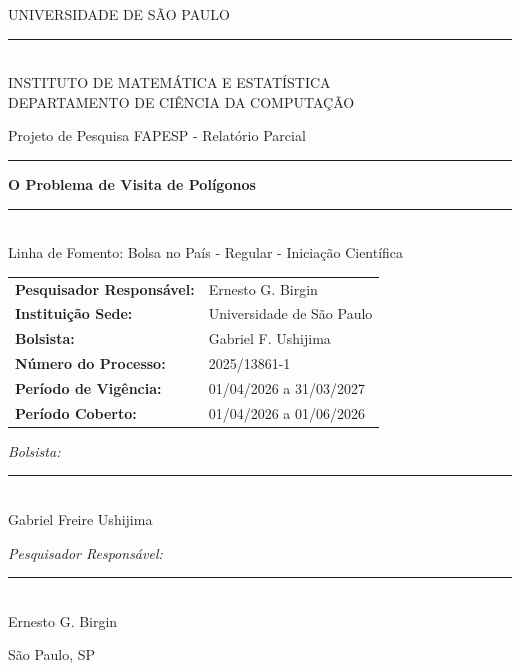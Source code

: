\documentclass[11pt]{article}
\begin{document}
\begin{titlepage}
	\begin{center}

		{\large \sc UNIVERSIDADE DE SÃO PAULO}
		\rule{/4}{1pt} \\
		{\sc INSTITUTO DE MATEMÁTICA E ESTATÍSTICA} \\
		{\small \sc DEPARTAMENTO DE CIÊNCIA DA COMPUTAÇÃO} \\
		
		\vspace{3.5cm}

		{\large \sc Projeto de Pesquisa FAPESP - Relatório Parcial} \\
		\rule{\linewidth}{2pt}
		
		\vspace{0.7em} %
		{\Large \bfseries 
			O Problema de Visita de Polígonos
		}
		\vspace{0.2em} %
		
		\rule{\linewidth}{2pt} \\
		{\small \sc Linha de Fomento: Bolsa no País - Regular - Iniciação Científica}
	\end{center}
	
	\vspace{1.8cm}

	\begin{center}
	\renewcommand{\arraystretch}{0.9}
	\begin{tabular}{@{} l l @{}}
		\textbf{Pesquisador Responsável:} & Ernesto G. Birgin \\
		\textbf{Instituição Sede:} & Universidade de São Paulo \\
		\textbf{Bolsista:} & Gabriel F. Ushijima \\
		\textbf{Número do Processo:} & 2025/13861-1 \\
		\textbf{Período de Vigência:} & 01/04/2026 a 31/03/2027 \\
		\textbf{Período Coberto:} & 01/04/2026 a 01/06/2026
	\end{tabular}
	\end{center}

	\vspace{1.8cm}

	\begin{minipage}{0.43\textwidth}
		\emph{Bolsista:}\\
		[1.08cm] \rule{0.9\linewidth}{0.3mm}\\
		Gabriel Freire Ushijima
	\end{minipage}
	\hfill
	\begin{minipage}{0.43\textwidth}
		\emph{Pesquisador Responsável:}\\
		[1.08cm]\rule{0.9\linewidth}{0.3mm}\\
		Ernesto G. Birgin
	\end{minipage}

	\vfill

	\begin{center}
		\makeatletter
		São Paulo, SP \\
		\@date
		\makeatother
	\end{center}
\end{titlepage}
\end{document}
